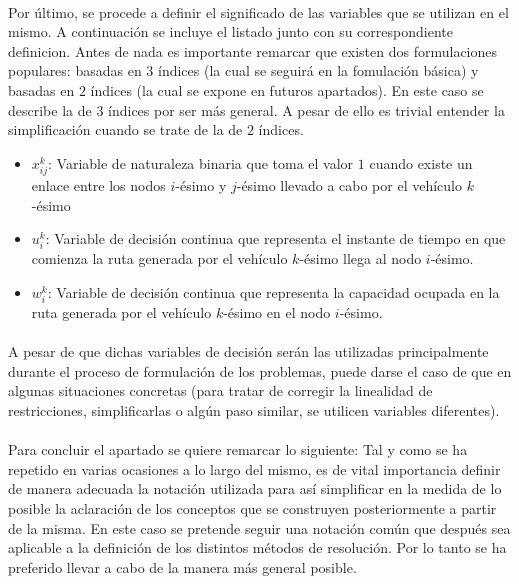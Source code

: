 \documentclass{subfiles}
\begin{document}
        \paragraph{}
        Por último, se procede a definir el significado de las variables que se utilizan en el mismo. A continuación se incluye el listado junto con su correspondiente definicion. Antes de nada es importante remarcar que existen dos formulaciones populares: basadas en $3$ índices (la cual se seguirá en la fomulación básica) y basadas en $2$ índices (la cual se expone en futuros apartados). En este caso se describe la de 3 índices por ser más general. A pesar de ello es trivial entender la simplificación cuando se trate de la de $2$ índices.

        \begin{itemize}
          \item $x_{ij}^{k}$: Variable de naturaleza binaria que toma el valor $1$ cuando existe un enlace entre los nodos $i$-ésimo y $j$-ésimo llevado a cabo por el vehículo $k$-ésimo
          \item $u_{i}^{k}$: Variable de decisión continua que representa el instante de tiempo en que comienza la ruta generada por el vehículo $k$-ésimo llega al nodo $i$-ésimo.
          \item $w_{i}^{k}$: Variable de decisión continua que representa la capacidad ocupada en la ruta generada por el vehículo $k$-ésimo en el nodo $i$-ésimo.
        \end{itemize}

        \paragraph{}
        A pesar de que dichas variables de decisión serán las utilizadas principalmente durante el proceso de formulación de los problemas, puede darse el caso de que en algunas situaciones concretas (para tratar de corregir la linealidad de restricciones, simplificarlas o algún paso similar, se utilicen variables diferentes).

      \paragraph{}
      Para concluir el apartado se quiere remarcar lo siguiente: Tal y como se ha repetido en varias ocasiones a lo largo del mismo, es de vital importancia definir de manera adecuada la notación utilizada para así simplificar en la medida de lo posible la aclaración de los conceptos que se construyen posteriormente a partir de la misma. En este caso se pretende seguir una notación común que después sea aplicable a la definición de los distintos métodos de resolución. Por lo tanto se ha preferido llevar a cabo de la manera más general posible.
\end{document}
